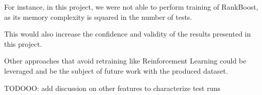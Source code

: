 For instance, in this project, we were not able
to perform training of RankBoost, as its memory complexity is squared in the
number of tests.

This would also increase the confidence and validity of the results presented in this 
project.

Other approaches that avoid retraining like Reinforcement Learning could be 
leveraged and be the subject of future work with the produced dataset.

TODOOO: add  discussion on other features to characterize test runs